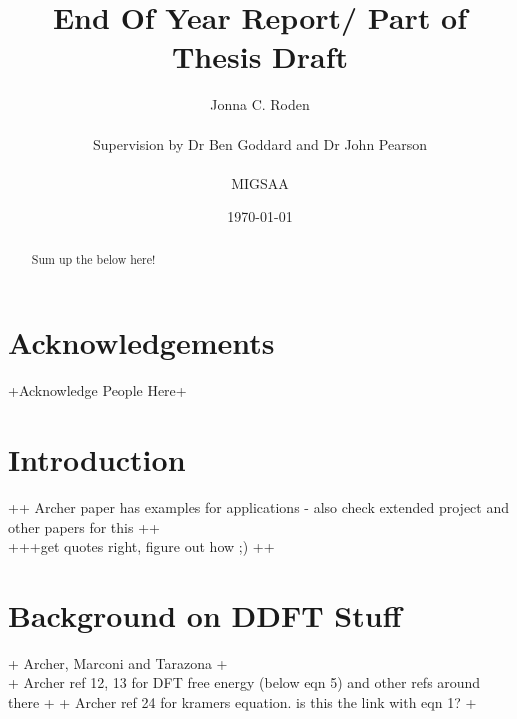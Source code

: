 \documentclass[11pt, a4paper]{article}
\title{End Of Year Report/ Part of Thesis Draft}
\author{Jonna C. Roden\\ \\Supervision by Dr Ben Goddard and Dr John Pearson\\ \\ \vspace{0.5cm} MIGSAA}
\date{\today}
\theoremstyle{definition}
\begin{document}
	
	\maketitle
	\begin{abstract}
		Sum up the below here!
		
	\end{abstract}
	
	\newpage
	\section*{Acknowledgements}
	+Acknowledge People Here+
	\newpage
	\tableofcontents
	\newpage
















\section{Introduction}
++ Archer paper has examples for applications - also check extended project and other papers for this ++\\
+++get quotes right, figure out how ;) ++

\section{Background on DDFT Stuff}
+ Archer, Marconi and Tarazona  +\\
+ Archer ref 12, 13 for DFT free energy (below eqn 5) and other refs around there +
+ Archer ref 24 for kramers equation. is this the link with eqn 1? +
\end{document}
